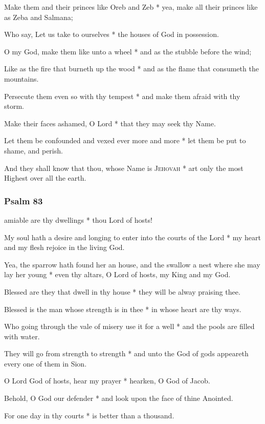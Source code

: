 Make them and their princes like Oreb and Zeb * yea, make all their princes like as Zeba and Salmana;

Who say, Let us take to ourselves * the houses of God in possession.

O my God, make them like unto a wheel * and as the stubble before the wind;

Like as the fire that burneth up the wood * and as the flame that consumeth the mountains.

Persecute them even so with thy tempest * and make them afraid with thy storm.

Make their faces ashamed, O Lord * that they may seek thy Name.

Let them be confounded and vexed ever more and more * let them be put to shame, and perish.

And they shall know that thou, whose Name is \textsc{Jehovah} * art only the most Highest over all the earth.

\subsubsection{Psalm 83}


 amiable are thy dwellings * thou Lord of hosts!

My soul hath a desire and longing to enter into the courts of the Lord * my heart and my flesh rejoice in the living God.

Yea, the sparrow hath found her an house, and the swallow a nest where she may lay her young * even thy altars, O Lord of hosts, my King and my God.

Blessed are they that dwell in thy house * they will be alway praising thee.

Blessed is the man whose strength is in thee * in whose heart are thy ways.

Who going through the vale of misery use it for a well * and the pools are filled with water.

They will go from strength to strength * and unto the God of gods appeareth every one of them in Sion.

O Lord God of hosts, hear my prayer * hearken, O God of Jacob.

Behold, O God our defender * and look upon the face of thine Anointed.

For one day in thy courts * is better than a thousand.

